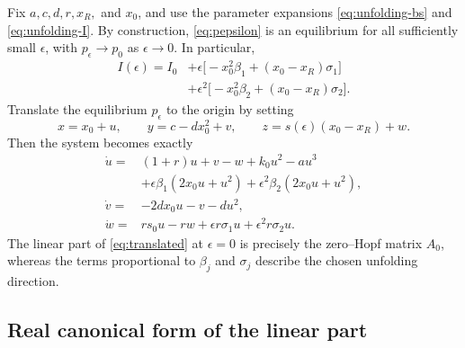 \documentclass[11pt]{amsart}
\theoremstyle{remark}
\begin{document}
Fix \(a,c,d,r,x_R,\) and \(x_0\), and use the parameter expansions
\eqref{eq:unfolding-bs} and \eqref{eq:unfolding-I}.  By construction,
\eqref{eq:pepsilon} is an equilibrium for all sufficiently small
\(\epsilon\), with \(p_\epsilon\to p_0\) as \(\epsilon\to0\).  In particular,
\begin{equation}\label{eq:I-expansion}
\begin{aligned}
I(\epsilon)=I_0
&+\epsilon\bigl[-x_0^2\beta_1+(x_0-x_R)\sigma_1\bigr]\\
&+\epsilon^2\bigl[-x_0^2\beta_2+(x_0-x_R)\sigma_2\bigr].
\end{aligned}
\end{equation}
Translate the equilibrium \(p_\epsilon\) to the origin by setting
\[
 x=x_0+u,\qquad
 y=c-dx_0^2+v,\qquad
 z=s(\epsilon)(x_0-x_R)+w.
\]
Then the system becomes exactly
\begin{equation}\label{eq:translated}
\begin{aligned}
\dot{u}={}&(1+r)u+v-w+k_0u^2-au^3\\
&+\epsilon\beta_1(2x_0u+u^2)
+\epsilon^2\beta_2(2x_0u+u^2),\\
\dot{v}={}&-2dx_0u-v-du^2,\\
\dot{w}={}&rs_0u-rw+\epsilon r\sigma_1u+\epsilon^2r\sigma_2u.
\end{aligned}
\end{equation}
The linear part of \eqref{eq:translated} at \(\epsilon=0\) is precisely the
zero--Hopf matrix \(A_0\), whereas the terms proportional to
\(\beta_j\) and \(\sigma_j\) describe the chosen unfolding direction.

\subsection{Real canonical form of the linear part}
\end{document}
